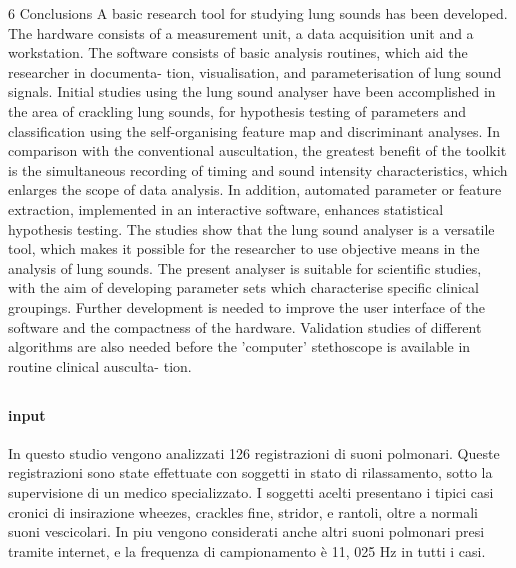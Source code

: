 6 Conclusions
A basic research tool for studying lung sounds has been
developed. The hardware consists of a measurement unit, a data
acquisition unit and a workstation. The software consists of
basic analysis routines, which aid the researcher in documenta-
tion, visualisation, and parameterisation of lung sound signals.
Initial studies using the lung sound analyser have been
accomplished in the area of crackling lung sounds, for
hypothesis testing of parameters and classification using the
self-organising feature map and discriminant analyses. In
comparison with the conventional auscultation, the greatest
benefit of the toolkit is the simultaneous recording of timing
and sound intensity characteristics, which enlarges the scope of
data analysis. In addition, automated parameter or feature
extraction, implemented in an interactive software, enhances
statistical hypothesis testing.
The studies show that the lung sound analyser is a versatile
tool, which makes it possible for the researcher to use objective
means in the analysis of lung sounds. The present analyser is
suitable for scientific studies, with the aim of developing
parameter sets which characterise specific clinical groupings.
Further development is needed to improve the user interface of
the software and the compactness of the hardware. Validation
studies of different algorithms are also needed before the
'computer' stethoscope is available in routine clinical ausculta-
tion.




\subsection{\cite{RSCUCAGMM}}
\subsection{\cite{ANAAFIORS}}
\subsection{\cite{KoronaKokar}}



\subsection{\cite{kandaswamy}}
\paragraph{input}
In questo studio vengono analizzati 126 registrazioni di suoni polmonari.
Queste registrazioni sono state effettuate con soggetti in stato di rilassamento, sotto la supervisione di un medico specializzato.
I soggetti acelti presentano i tipici casi cronici di insirazione wheezes, crackles fine, stridor, e rantoli, oltre a normali 
suoni vescicolari.
In piu vengono considerati anche altri suoni polmonari presi tramite internet, e la frequenza di campionamento \`e 11, 025 Hz in tutti i casi.

